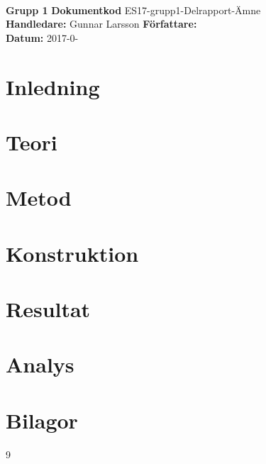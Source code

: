 \documentclass[a4paper, 11pt]{article}
\begin{document}
  \\
\vspace{1cm} 



\noindent\textbf{Grupp 1} \hfill \textbf{Dokumentkod} ES17-grupp1-Delrapport-Ämne  
\hfill \\
\textbf{Handledare:} Gunnar Larsson
\hfill \textbf{Författare:}   \\ 
\hfill \textbf{Datum:} 2017-0- \\
\vspace{3cm} 

\begin{abstract}

\end{abstract}
\newpage
\section*{Inledning}


\section*{Teori}


\section*{Metod}


\section*{Konstruktion}

\section*{Resultat}

\section*{Analys}

\section*{Bilagor}

\begin{thebibliography}{9}

\end{thebibliography}
\end{document}
